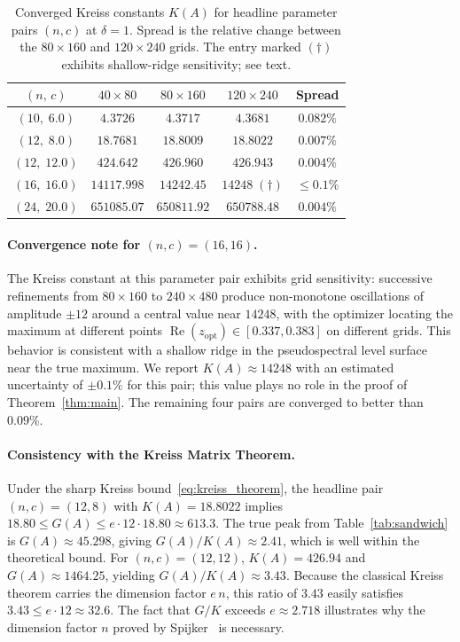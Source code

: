 \documentclass[11pt,reqno]{article}
\theoremstyle{plain}
\theoremstyle{definition}
\theoremstyle{remark}
\numberwithin{equation}{section}
\begin{document}
\begin{table}[ht]
\centering
\caption{Converged Kreiss constants $K(A)$ for headline parameter pairs $(n, c)$ at $\delta = 1$. Spread is the relative change between the $80\times160$ and $120\times240$ grids. The entry marked $(\dagger)$ exhibits shallow-ridge sensitivity; see text.}
\label{tab:kreiss}
\begin{tabular}{ccccc}
\toprule
$(n,\,c)$ & $40\times80$ & $80\times160$ & $120\times240$ & Spread \\
\midrule
$(10,\;6.0)$  & $4.3726$    & $4.3717$    & $4.3681$           & $0.082\%$     \\
$(12,\;8.0)$  & $18.7681$   & $18.8009$   & $18.8022$          & $0.007\%$     \\
$(12,\;12.0)$ & $424.642$   & $426.960$   & $426.943$          & $0.004\%$     \\
$(16,\;16.0)$ & $14117.998$ & $14242.45$  & $14248\;(\dagger)$ & $\le 0.1\%$   \\
$(24,\;20.0)$ & $651085.07$ & $650811.92$ & $650788.48$        & $0.004\%$     \\
\bottomrule
\end{tabular}
\end{table}

\paragraph{Convergence note for $(n,c) = (16,16)$.} The Kreiss constant at this parameter pair exhibits grid sensitivity: successive refinements from $80\times160$ to $240\times480$ produce non-monotone oscillations of amplitude $\pm 12$ around a central value near $14248$, with the optimizer locating the maximum at different points $\operatorname{Re}(z_{\mathrm{opt}}) \in [0.337, 0.383]$ on different grids. This behavior is consistent with a shallow ridge in the pseudospectral level surface near the true maximum. We report $K(A) \approx 14248$ with an estimated uncertainty of $\pm 0.1\%$ for this pair; this value plays no role in the proof of Theorem~\ref{thm:main}. The remaining four pairs are converged to better than $0.09\%$.

\paragraph{Consistency with the Kreiss Matrix Theorem.} Under the sharp Kreiss bound~\eqref{eq:kreiss_theorem}, the headline pair $(n,c) = (12,8)$ with $K(A) = 18.8022$ implies $18.80 \le G(A) \le e \cdot 12 \cdot 18.80 \approx 613.3$. The true peak from Table~\ref{tab:sandwich} is $G(A) \approx 45.298$, giving $G(A)/K(A) \approx 2.41$, which is well within the theoretical bound. For $(n,c) = (12,12)$, $K(A) = 426.94$ and $G(A) \approx 1464.25$, yielding $G(A)/K(A) \approx 3.43$. Because the classical Kreiss theorem carries the dimension factor $e\,n$, this ratio of $3.43$ easily satisfies $3.43 \le e \cdot 12 \approx 32.6$. The fact that $G/K$ exceeds $e \approx 2.718$ illustrates why the dimension factor $n$ proved by Spijker~\cite{Spijker1991} is necessary.
\end{document}
